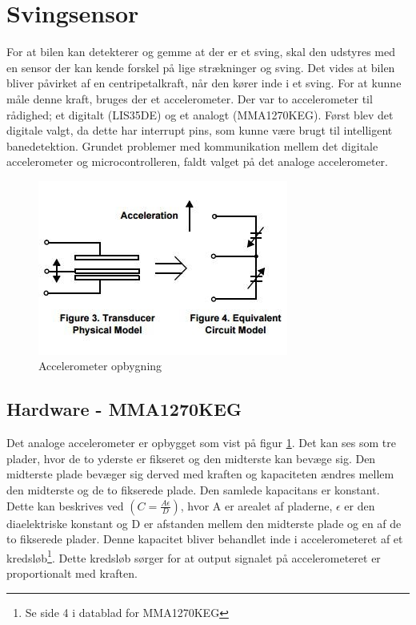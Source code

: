 \section{Svingsensor}
\label{svingsensor}
For at bilen kan detekterer og gemme at der er et sving, skal den udstyres med en sensor der kan kende forskel på lige strækninger og sving. Det vides at bilen bliver påvirket af en centripetalkraft, når den kører inde i et sving. For at kunne måle denne kraft, bruges der et accelerometer. Der var to accelerometer til rådighed; et digitalt (LIS35DE) og et analogt (MMA1270KEG). Først blev det digitale valgt, da dette har interrupt pins, som kunne være brugt til intelligent banedetektion. Grundet problemer med kommunikation mellem det digitale accelerometer og microcontrolleren, faldt valget på det analoge accelerometer.

\begin{figure}[h!]
\center
\includegraphics[scale=1]{./Graphics/Acceleration}
\caption{Accelerometer opbygning}
\label{Acceleration}
\end{figure}

\subsection{Hardware - MMA1270KEG}
Det analoge accelerometer er opbygget som vist på figur \ref{Acceleration}. Det kan ses som tre plader, hvor de to yderste er fikseret og den midterste kan bevæge sig. Den midterste plade bevæger sig derved med kraften og kapaciteten ændres mellem den midterste og de to fikserede plade. Den samlede kapacitans er konstant. Dette kan beskrives ved $(C=\frac{A\epsilon}{D})$, hvor A er arealet af pladerne, $\epsilon$ er den diaelektriske konstant og D er afstanden mellem den midterste plade og en af de to fikserede plader. Denne kapacitet bliver behandlet inde i accelerometeret af et kredsløb\footnote{Se side 4 i datablad for MMA1270KEG}. Dette kredsløb sørger for at output signalet på accelerometeret er proportionalt med kraften. 

